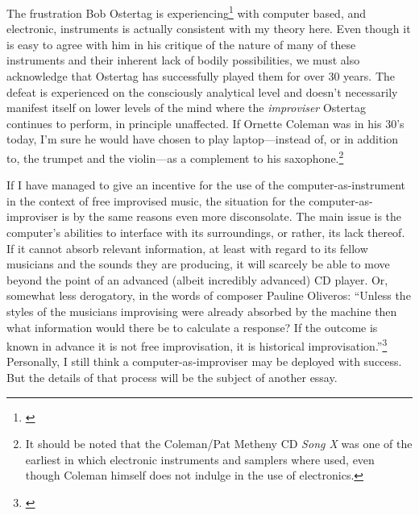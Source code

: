 The frustration Bob Ostertag is experiencing\footnote{\citet{ostertag02}} with
computer based, and electronic, instruments is actually consistent
with my theory here. Even though it is easy to agree with him in his
critique of the nature of many of these instruments and their inherent
lack of bodily possibilities, we must also acknowledge that Ostertag
has successfully played them for over 30 years. The defeat is
experienced on the consciously analytical level and doesn't
necessarily manifest itself on lower levels of the mind where the
\emph{improviser} Ostertag continues to perform, in principle
unaffected.  If Ornette Coleman was in his 30's today, I'm sure he
would have chosen to play laptop---instead of, or in addition to, the
trumpet and the violin---as a complement to his saxophone.\footnote{It
  should be noted that the Coleman/Pat Metheny CD \emph{Song
    X} \citep{metheny86} was one of the earliest in which electronic
  instruments and samplers where used, even though Coleman himself
  does not indulge in the use of electronics.}

If I have managed to give an incentive for the use of the
computer-as-instrument in the context of free improvised music, the
situation for the computer-as-improviser is by the same reasons even
more disconsolate. The main issue is the computer's abilities to
interface with its surroundings, or rather, its lack thereof. If it
cannot absorb relevant information, at least with regard to its fellow
musicians and the sounds they are producing, it will scarcely be able
to move beyond the point of an advanced (albeit incredibly advanced)
CD player. Or, somewhat less derogatory, in the words of composer
Pauline Oliveros: ``Unless the styles of the musicians improvising
were already absorbed by the machine then what information would there
be to calculate a response? If the outcome is known in advance it is
not free improvisation, it is historical
improvisation.''\footnote{\citet[p. 122]{oliveros08}} Personally, I still
think a computer-as-improviser may be deployed with success. But the
details of that process will be the subject of another essay.



